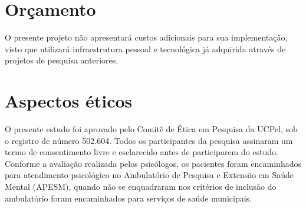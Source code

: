 \documentclass[chapter=TITLE,
               oneside,
               12pt,
               a4paper,
               english,
               brazil]{abntex2}    %
\begin{document}
\section{Orçamento}\label{sec:orcamento}

    O presente projeto não apresentará custos adicionais para sua implementação,
    visto que utilizará infraestrutura pessoal e tecnológica já adquirida através
    de projetos de pesquisa anteriores.

\section{Aspectos éticos}\label{sec:aspectoseticos}

    O presente estudo foi aprovado pelo Comitê de Ética em Pesquisa da UCPel,
    sob o registro de número 502.604. Todos os participantes da pesquisa assinaram
    um termo de consentimento livre e esclarecido antes de participarem do estudo.
    Conforme a avaliação realizada pelos psicólogos, os pacientes foram encaminhados
    para atendimento psicológico no Ambulatório de Pesquisa e Extensão em Saúde Mental
    (APESM), quando não se enquadraram nos critérios de inclusão do ambulatório foram
    encaminhados para serviços de saúde municipais.

\endgroup

\postextual

\printbibliography

\apendices
\end{document}
